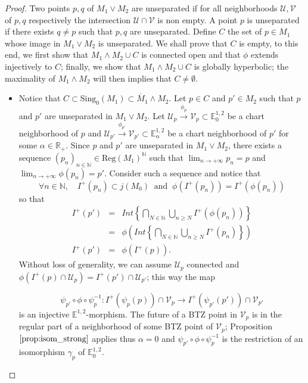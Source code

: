 \documentclass[a4paper,12pt]{article}
\def\U{\mathcal U}
\def\V{\mathcal V}
\def\N{\mathbb N}
\def\sing{\mathrm{Sing}}
\def\RR{\mathbb{R}}
\newcommand{\mass}[1]{{\mathbb E}^{1,2}_{#1}}
\def\Reg{\mathrm{Reg}}
\def\pgcd{M_1\wedge M_2}
\def\ppcm{M_1\vee M_2}
\def\reg{\Reg}
\begin{document}
\begin{proof}
			 Two points $p,q$ of $\ppcm$ are unseparated if  for all neighborhoods $\U,\V$ of $p,q$ respectively the intersection $\U\cap \V $ is non empty. A point $p$ is unseparated if there exists $q\neq p$ such that $p,q$ are unseparated. 
			Define $C$ the set of  $p\in M_1$ whose image in $\ppcm$ is unseparated. We shall prove that $C$ is empty, to this end, we first show that $\pgcd \cup C$ is connected open and that $\phi$ extends injectively to $C$;  finally, we show that $\pgcd\cup C$ is
			globally hyperbolic; the maximality of $\pgcd$ will then implies that $C\neq \emptyset$.
			\begin{itemize}
				\item 	Notice that $C\subset \sing_0(M_1)\subset \overline \pgcd$.
					Let $p\in C$ and $p' \in M_2$ such that $p$ and $p'$ are unseparated in $\ppcm$. Let
					$\U_p\xrightarrow{\phi_p} \V_p \subset \mass{0}$ be a chart neighborhood of $p$ and $\U_{p'}\xrightarrow{\phi_{p'}} \V_{p'} \subset \mass{\alpha}$
					be a chart neighborhood of $p'$ for some $\alpha \in \RR_+$. Since $p$ and $p'$ are unseparated
					in $\ppcm$, there exists a sequence $(p_n)_{n\in \N} \in \reg(M_1)^\N$ such that
					$\lim_{n\rightarrow +\infty } p_n =p$ and $\lim_{n\rightarrow +\infty} \phi(p_n) = p'$.
					Consider such a sequence and notice that
					$$\forall n\in \N,\quad I^+(p_n)\subset j(M_0) ~\text{ and }~\phi\left(I^+(p_n)\right)=I^+(\phi(p_n)) $$
	so that
					\begin{eqnarray*}
						I^+(p') &=&	Int\left\{\bigcap_{N\in \N} \bigcup _{n\geq N} I^+(\phi(p_n))\right\} \\
							&=&	\phi\left(Int\left\{\bigcap_{N\in \N} \bigcup _{n\geq N} I^+(p_n)\right\}\right) \\
					I^+(p') &=& \phi(I^+(p)).
					\end{eqnarray*}
					Without loss of generality, we can assume
					$\U_p$ connected and $\phi(I^+(p)\cap \U_p) = I^+(p')\cap \U_{p'}$; this way the map
					
						$$\psi_{p'} \circ \phi \circ \psi_p^{-1}: I^+(\psi_p(p))\cap \V_p \rightarrow I^+(\psi_{p'}(p'))\cap \V_{p'}$$
						is an injective $\mass{}$-morphism.
						The future of a BTZ point in $\V_p$ is in the regular part of a neighborhood of some BTZ point of $\V_p$;
						Proposition $\ref{prop:isom_strong}$ applies thus $\alpha=0$ and $\psi_{p'} \circ \phi \circ \psi_p^{-1}$
						is the restriction of an isomorphism $\gamma_p$ of $\mass{0}$.
						

\end{itemize}
\end{proof}
\end{document}

